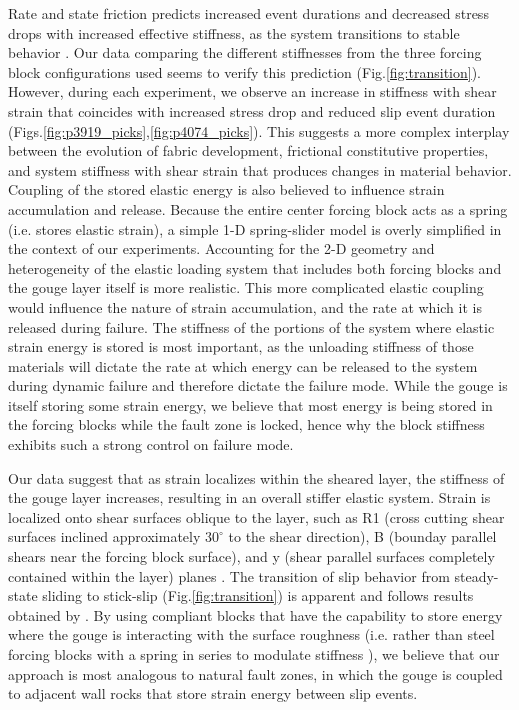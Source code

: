 Rate and state friction predicts increased event durations and decreased stress
drops with increased effective stiffness, as the system transitions to stable
behavior \cite{Baumberger_1999}. Our data comparing the different stiffnesses
from the three forcing block configurations used seems to verify this prediction
(Fig.\ref{fig:transition}).  However, during each experiment, we observe an
increase in stiffness with shear strain that coincides with increased stress
drop and reduced slip event duration
(Figs.\ref{fig:p3919_picks},\ref{fig:p4074_picks}).  This suggests a more
complex interplay between the evolution of fabric development, frictional
constitutive properties, and system stiffness with shear strain that produces
changes in material behavior.  Coupling of the stored elastic energy is also
believed to influence strain accumulation and release.  Because the entire
center forcing block acts as a spring (i.e. stores elastic strain), a simple 1-D
spring-slider model is overly simplified in the context of our experiments.
Accounting for the 2-D geometry and heterogeneity of the elastic loading system
that includes both forcing blocks and the gouge layer itself is more realistic.
This more complicated elastic coupling would influence the nature of strain
accumulation, and the rate at which it is released during failure. The stiffness
of the portions of the system where elastic strain energy is stored is most
important, as the unloading stiffness of those materials will dictate the rate
at which energy can be released to the system during dynamic failure and
therefore dictate the failure mode. While the gouge is itself storing some
strain energy, we believe that most energy is being stored in the forcing blocks
while the fault zone is locked, hence why the block stiffness exhibits such a strong
control on failure mode.

Our data suggest that as strain localizes within the sheared layer, the
stiffness of the gouge layer increases, resulting in an overall stiffer elastic
system. Strain is localized onto shear surfaces oblique to the layer, such as R1
(cross cutting shear surfaces inclined approximately $30^\circ$ to the shear
direction), B (bounday parallel shears near the forcing block surface), and y
(shear parallel surfaces completely contained within the layer) planes
\cite{loganl1992fabrics,marone1998laboratory}.  The transition of slip behavior from
steady-state sliding to stick-slip (Fig.\ref{fig:transition}) is apparent and
follows results obtained by \cite{Baumberger_1999}. By using compliant blocks
that have the capability to store energy where the gouge is interacting with the
surface roughness (i.e. rather than steel forcing blocks with a spring in series
to modulate stiffness \cite{kaproth2013slow}), we believe that our approach is
most analogous to natural fault zones, in which the gouge is coupled to adjacent
wall rocks that store strain energy between slip events.

